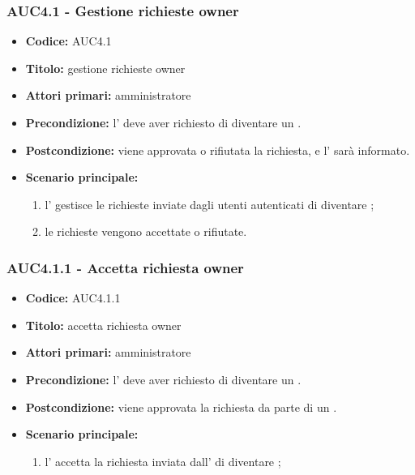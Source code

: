 \documentclass[casi-duso]{subfiles}
\begin{document}
\subsubsection{AUC4.1 - Gestione richieste owner}
\label{subsub:AUC4.1}
\begin{itemize}
  \item \textbf{Codice:} AUC4.1
  \item \textbf{Titolo:} gestione richieste owner
  \item \textbf{Attori primari:} amministratore
  \item \textbf{Precondizione:} l' deve aver richiesto di diventare un .
  \item \textbf{Postcondizione:} viene approvata o rifiutata la richiesta, e l' sarà informato.
  \item \textbf{Scenario principale:} 
  \begin{enumerate}
    \item l' gestisce le richieste inviate dagli utenti autenticati di diventare ;
    \item le richieste vengono accettate o rifiutate.
  \end{enumerate}
\end{itemize}

\subsubsection{AUC4.1.1 - Accetta richiesta owner}
\label{subsub:AUC4.1.1}
\begin{itemize}
  \item \textbf{Codice:} AUC4.1.1
  \item \textbf{Titolo:} accetta richiesta owner
  \item \textbf{Attori primari:} amministratore
  \item \textbf{Precondizione:} l' deve aver richiesto di diventare un .
  \item \textbf{Postcondizione:} viene approvata la richiesta da parte di un .
  \item \textbf{Scenario principale:} 
  \begin{enumerate}
    \item l' accetta la richiesta inviata dall' di diventare ;
  \end{enumerate}
\end{itemize}
\end{document}
